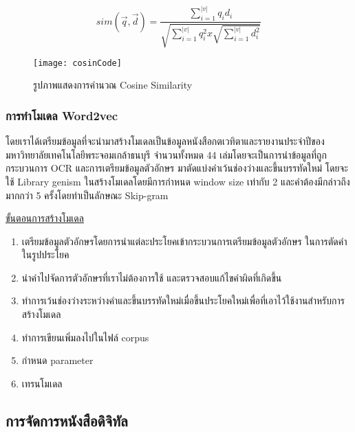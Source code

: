 \begin{equation}
    sim(\vec{q},\vec{d})=\frac{\sum_{i=1}^{|v|}q_{i}d_{i} }{\sqrt{\sum_{i=1}^{|v|}q^{2}_{i}x\sqrt{\sum_{i=1}^{|v|}d^{2}_{i}}}}
    \end{equation}    

\begin{figure}[H]
    \centering
    \texttt{[image: cosinCode]}
    \caption{รูปภาพแสดงการคำนวณ Cosine Similarity}\label{fig:cosinCode}
\end{figure}

\subsubsection{การทำโมเดล Word2vec}

โดยเราได้เตรียมข้อมูลที่จะนำมาสร้างโมเดลเป็นข้อมูลหนังสือกตเวทิตาและรายงานประจำปีของมหาวิทยาลัยเทคโนโลยีพระจอมเกล้าธนบุรี 
จำนวนทั้งหมด 44 เล่มโดยจะเป็นการนำข้อมูลที่ถูกกระบวนการ OCR และการเตรียมข้อมูลตัวอักษร มาตัดแบ่งคำเว้นช่องว่างและขึ้นบรรทัดใหม่ 
โดยจะใช้ Library genism ในสร้างโมเดลโดยมีการกำหนด window size เท่ากับ 2 และคำต้องมีกล่าวถึงมากกว่า 5 ครั้งโดยทำเป็นลักษณะ Skip-gram

\underline{ขั้นตอนการสร้างโมเดล}

\begin{enumerate}
    \item เตรียมข้อมูลตัวอักษรโดยการนำแต่ละประโยคเข้ากระบวนการเตรียมข้อมูลตัวอักษร ในการตัดคำในรูปประโยค
    \item นำคำไปจัดการตัวอักษรที่เราไม่ต้องการใช้ และตรวจสอบแก้ไขคำผิดที่เกิดขึ้น
    \item ทำการเว้นช่องว่างระหว่างคำและขึ้นบรรทัดใหม่เมื่อขึ้นประโยคใหม่เพื่อที่เอาไว้ใช้งานสำหรับการสร้างโมเดล
    \item ทำการเขียนเพิ่มลงไปในไฟล์ corpus
    \item กำหนด parameter 
    \item เทรนโมเดล
\end{enumerate}

\subsection{การจัดการหนังสือดิจิทัล}

